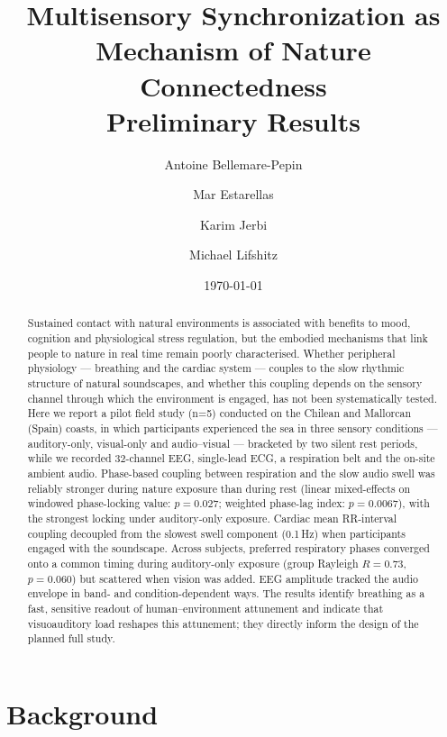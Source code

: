 \documentclass[11pt,a4paper]{article}
\title{\textbf{Multisensory Synchronization as Mechanism of Nature Connectedness}\\[0.3em]
\large Preliminary Results}
\author{Antoine Bellemare-Pepin \and Mar Estarellas \and Karim Jerbi \and Michael Lifshitz}
\date{\today}
\begin{document}
\maketitle

\begin{abstract}
\noindent Sustained contact with natural environments is associated with
benefits to mood, cognition and physiological stress regulation, but the
embodied mechanisms that link people to nature in real time remain poorly
characterised. Whether peripheral physiology --- breathing and the cardiac
system --- couples to the slow rhythmic structure of natural soundscapes,
and whether this coupling depends on the sensory channel through which the
environment is engaged, has not been systematically tested. Here we report a
pilot field study (n=5) conducted on the Chilean and Mallorcan
(Spain) coasts, in which participants experienced the sea in three sensory
conditions --- auditory-only, visual-only and audio--visual --- bracketed by
two silent rest periods, while we recorded 32-channel EEG, single-lead ECG,
a respiration belt and the on-site ambient audio. Phase-based coupling
between respiration and the slow audio swell was reliably stronger during
nature exposure than during rest (linear mixed-effects on windowed
phase-locking value: $p=0.027$; weighted phase-lag index: $p=0.0067$), with
the strongest locking under auditory-only exposure. Cardiac mean RR-interval
coupling decoupled from the slowest swell component (0.1\,Hz) when
participants engaged with the soundscape. Across subjects, preferred
respiratory phases converged onto a common timing during auditory-only
exposure (group Rayleigh $R=0.73$, $p=0.060$) but scattered when vision was
added. EEG amplitude tracked the audio envelope in band- and
condition-dependent ways. The results identify breathing as a fast,
sensitive readout of human--environment attunement and indicate that
visuoauditory load reshapes this attunement; they directly inform the design
of the planned full study.
\end{abstract}

\vspace{1em}

\section{Background}
\end{document}
